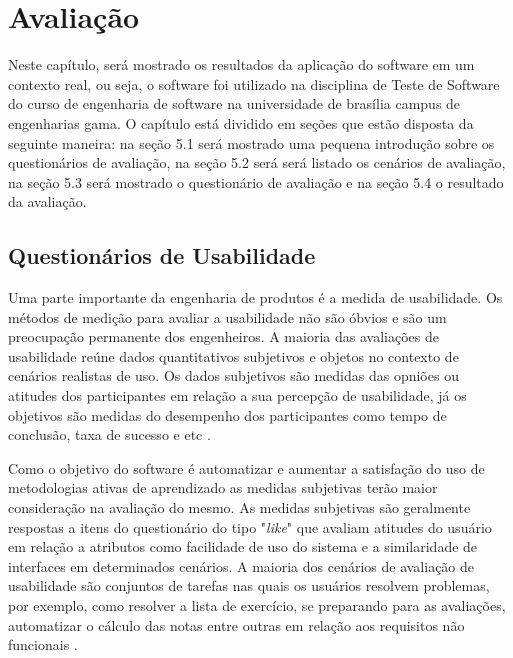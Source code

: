 \chapter{Avaliação}

Neste capítulo, será mostrado os resultados da aplicação do software em um contexto real, ou seja, o software foi
utilizado na disciplina de Teste de Software do curso de engenharia de software na universidade de brasília campus
de engenharias gama. O capítulo está dividido em seções que estão disposta da seguinte maneira: na seção 5.1 será mostrado
uma pequena introdução sobre os questionários de avaliação, na seção 5.2 será será listado os cenários de avaliação, na
seção 5.3 será mostrado o questionário de avaliação e na seção 5.4 o resultado da avaliação.

\section{Questionários de Usabilidade}

Uma parte importante da engenharia de produtos é a medida de usabilidade. Os métodos de medição para avaliar a
usabilidade não são óbvios e são um preocupação permanente dos engenheiros. A maioria das avaliações de usabilidade
reúne dados quantitativos subjetivos e objetos no contexto de cenários realistas de uso. Os dados subjetivos são medidas
das opniões ou atitudes dos participantes em relação a sua percepção de usabilidade, já os objetivos são medidas do
desempenho dos participantes como tempo de conclusão, taxa de sucesso e etc \cite{questionario}.

Como o objetivo do software é automatizar e aumentar a satisfação do uso de metodologias ativas de aprendizado as
medidas subjetivas terão maior consideração na avaliação do mesmo. As medidas subjetivas são geralmente respostas a
itens do questionário do tipo "\textit{like}" que avaliam atitudes do usuário em relação a atributos como facilidade de uso do
sistema e a similaridade de interfaces em determinados cenários. A maioria dos cenários de avaliação de usabilidade são
conjuntos de tarefas nas quais os usuários resolvem problemas, por exemplo, como resolver a lista de exercício, se
preparando para as avaliações, automatizar o cálculo das notas entre outras em relação aos requisitos não funcionais \cite{questionario}.

